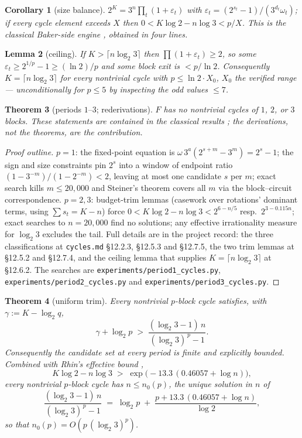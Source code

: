 \documentclass[11pt]{article}
\newtheorem{theorem}{Theorem}[section]
\newtheorem{lemma}[theorem]{Lemma}
\newtheorem{corollary}[theorem]{Corollary}
\theoremstyle{remark}
\newcommand{\w}{\omega}
\newcommand{\LL}{\log_2 3}
\begin{document}
\begin{corollary}[size balance]\label{cor:size}
$2^K = 3^n \prod_t (1 + \varepsilon_t)$ with $\varepsilon_t = (2^{s_t}-1)/(3^{d_t}\w_t)$; if every cycle element exceeds $X$ then $0 < K\log 2 - n\log 3 < p/X$. This is the classical Baker-side engine \cite{eliahou}, obtained in four lines.
\end{corollary}

\begin{lemma}[ceiling]\label{lem:ceiling}
If $K > \lceil n\LL \rceil$ then $\prod(1+\varepsilon_t) \ge 2$, so some $\varepsilon_t \ge 2^{1/p}-1 \ge (\ln 2)/p$ and some block exit is $< p/\ln 2$. Consequently $K = \lceil n \LL\rceil$ for every nontrivial cycle with $p \le \ln 2 \cdot X_0$, $X_0$ the verified range \cite{barina} --- unconditionally for $p\le5$ by inspecting the odd values $\le 7$.
\end{lemma}

\begin{theorem}[periods $1$--$3$; rederivations]\label{thm:smallp}
$F$ has no nontrivial cycles of $1$, $2$, or $3$ blocks. These statements are contained in the classical results \cite{steiner,sdw,hercher}; the derivations, not the theorems, are the contribution.
\end{theorem}

\begin{proof}[Proof outline]
$p=1$: the fixed-point equation is $\w\,3^a(2^{s+m}-3^m) = 2^s-1$; the sign and size constraints pin $2^s$ into a window of endpoint ratio $(1-3^{-m})/(1-2^{-m}) < 2$, leaving at most one candidate $s$ per $m$; exact search kills $m \le 20{,}000$ and Steiner's theorem \cite{steiner} covers all $m$ via the block--circuit correspondence. $p=2,3$: budget-trim lemmas (casework over rotations' dominant terms, using $\sum s_t = K - n$) force $0 < K\log2 - n\log3 < 2^{6-n/5}$ resp.\ $2^{3-0.115n}$; exact searches to $n = 20{,}000$ find no solutions; any effective irrationality measure for $\LL$ \cite{rhin} excludes the tail. Full details are in the project record: the three classifications at \texttt{cycles.md} \S12.2.3, \S12.5.3 and \S12.7.5, the two trim lemmas at \S12.5.2 and \S12.7.4, and the ceiling lemma that supplies $K = \lceil n\LL\rceil$ at \S12.6.2. The searches are \texttt{experiments/period1\_cycles.py}, \texttt{experiments/period2\_cycles.py} and \texttt{experiments/period3\_cycles.py}.
\end{proof}

\begin{theorem}[uniform trim]\label{thm:uniform}
Every nontrivial $p$-block cycle satisfies, with $\gamma := K - \log_2 q$,
\[ \gamma + \log_2 p \;>\; \frac{(\LL - 1)\, n}{(\LL)^{\,p} - 1}. \]
Consequently the candidate set at every period is finite and explicitly bounded. Combined with Rhin's effective bound \cite{rhin},
\[ K\log 2 - n\log 3 \;>\; \exp\bigl(-13.3\,(0.46057 + \log n)\bigr), \]
every nontrivial $p$-block cycle has $n \le n_0(p)$, the unique solution in $n$ of
\[ \frac{(\LL - 1)\,n}{(\LL)^{\,p} - 1} \;=\; \log_2 p \;+\; \frac{p + 13.3\,(0.46057 + \log n)}{\log 2}, \]
so that $n_0(p) = O(p\,(\LL)^p)$.
\end{theorem}
\end{document}
